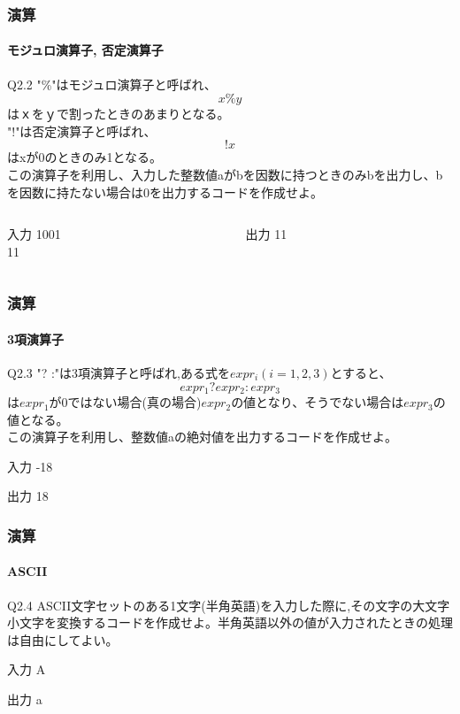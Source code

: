 \documentclass[dvipdfmx]{beamer}
\begin{document}
\begin{frame}
    \frametitle{演算}
    \framesubtitle{モジュロ演算子, 否定演算子}
	\begin{itembox}[l]{Q2.2}
        "\%"はモジュロ演算子と呼ばれ、
        $$x \% y$$
        はｘをｙで割ったときのあまりとなる。\\
        "!"は否定演算子と呼ばれ、
        $$!x$$
        はxが0のときのみ1となる。\\
        この演算子を利用し、入力した整数値aがbを因数に持つときのみbを出力し、bを因数に持たない場合は0を出力するコードを作成せよ。
	\end{itembox}
    \vspace{-30pt}
    \begin{columns}[t, totalwidth=0.98\linewidth]
        \begin{column}{.45\linewidth}
            \begin{block}{入力}
                1001\\
                11
            \end{block}
        \end{column}
        \begin{column}{.45\linewidth}
            \begin{block}{出力}
                11
            \end{block}
        \end{column}
    \end{columns}
\end{frame}

\begin{frame}
    \frametitle{演算}
    \framesubtitle{3項演算子}
	\begin{itembox}[l]{Q2.3}
        "? :"は3項演算子と呼ばれ,ある式を$expr_{i}(i=1,2,3)$とすると、
        $$expr_{1} ? expr_{2}:expr_{3}$$
        は$expr_{1}$が0ではない場合(真の場合)$expr_{2}$の値となり、そうでない場合は$expr_{3}$の値となる。\\
        この演算子を利用し、整数値aの絶対値を出力するコードを作成せよ。
	\end{itembox}
	\begin{block}{入力}
        -18
	\end{block}
	\begin{block}{出力}
        18
	\end{block}
\end{frame}

\begin{frame}
    \frametitle{演算}
    \framesubtitle{ASCII}
	\begin{itembox}[l]{Q2.4}
        ASCII文字セットのある1文字(半角英語)を入力した際に,その文字の大文字小文字を変換するコードを作成せよ。半角英語以外の値が入力されたときの処理は自由にしてよい。
	\end{itembox}
	\begin{block}{入力}
        A
	\end{block}
	\begin{block}{出力}
        a
	\end{block}
\end{frame}
\end{document}
